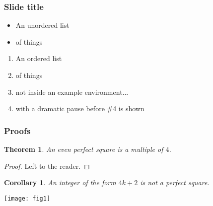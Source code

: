 \documentclass{beamer}
\theoremstyle{theorem}
\newtheorem{cor}{Corollary}
\newtheorem{thm}{Theorem}
\theoremstyle{definition}
\begin{document}
\begin{frame}
\frametitle{Slide title}

\begin{itemize}
\item An unordered list
\item of things
\end{itemize}

\pause

\begin{enumerate}
\item An ordered list
\item of things
\item not inside an example environment...
\pause
\item with a dramatic pause before \#4 is shown
\end{enumerate}

\end{frame}


\begin{frame}
\frametitle{Proofs}

\begin{thm}
An even perfect square is a multiple of $4$.
\end{thm}

\begin{proof}
Left to the reader.
\end{proof}

\begin{cor}
An integer of the form $4k+2$ is not a perfect square.
\end{cor}

\end{frame}


\begin{frame}[plain]
\begin{center}
\texttt{[image: fig1]}
\end{center}
\end{frame}

\end{document}
